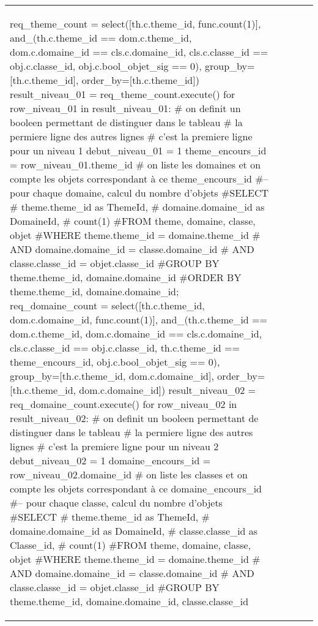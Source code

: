 \documentclass[12pt,titlepage,oneside]{book}
\begin{document}
\begin{supertabular}{|p{7.5cm}|p{7.5cm}|p{7.5cm}|c|p{10cm}|}
\begin{lbdpython}
req_theme_count = select([th.c.theme_id, func.count(1)],
                  and_(th.c.theme_id == dom.c.theme_id,
                       dom.c.domaine_id == cls.c.domaine_id,
                       cls.c.classe_id == obj.c.classe_id,
                       obj.c.bool_objet_sig == 0),
                  group_by=[th.c.theme_id],
                  order_by=[th.c.theme_id])
result_niveau_01 = req_theme_count.execute()
for row_niveau_01 in result_niveau_01:
   # on definit un booleen permettant de distinguer dans le tableau
   # la permiere ligne des autres lignes
   # c'est la premiere ligne pour un niveau 1
   debut_niveau_01 = 1
   theme_encours_id = row_niveau_01.theme_id
   # on liste les domaines et on compte les objets correspondant à ce theme_encours_id
   #-- pour chaque domaine, calcul du nombre d'objets
   #SELECT
   #   theme.theme_id as ThemeId,
   #   domaine.domaine_id as DomaineId,
   #   count(1)
   #FROM theme, domaine, classe, objet
   #WHERE theme.theme_id = domaine.theme_id
   #  AND domaine.domaine_id = classe.domaine_id
   #  AND classe.classe_id = objet.classe_id
   #GROUP BY theme.theme_id, domaine.domaine_id
   #ORDER BY theme.theme_id, domaine.domaine_id;
   req_domaine_count = select([th.c.theme_id, dom.c.domaine_id, func.count(1)],
                       and_(th.c.theme_id == dom.c.theme_id,
                            dom.c.domaine_id == cls.c.domaine_id,
                            cls.c.classe_id == obj.c.classe_id,
                            th.c.theme_id == theme_encours_id,
                            obj.c.bool_objet_sig == 0),
                       group_by=[th.c.theme_id, dom.c.domaine_id],
                       order_by=[th.c.theme_id, dom.c.domaine_id])
   result_niveau_02 = req_domaine_count.execute()
   for row_niveau_02 in result_niveau_02:
      # on definit un booleen permettant de distinguer dans le tableau
      # la permiere ligne des autres lignes
      # c'est la premiere ligne pour un niveau 2
      debut_niveau_02 = 1
      domaine_encours_id = row_niveau_02.domaine_id
      # on liste les classes et on compte les objets correspondant à ce domaine_encours_id
      #-- pour chaque classe, calcul du nombre d'objets
      #SELECT
      #   theme.theme_id as ThemeId,
      #   domaine.domaine_id as DomaineId,
      #   classe.classe_id as Classe_id,
      #   count(1)
      #FROM theme, domaine, classe, objet
      #WHERE theme.theme_id = domaine.theme_id 
      #  AND domaine.domaine_id = classe.domaine_id
      #  AND classe.classe_id = objet.classe_id
      #GROUP BY theme.theme_id, domaine.domaine_id, classe.classe_id

\end{lbdpython}
\end{supertabular}
\end{document}
